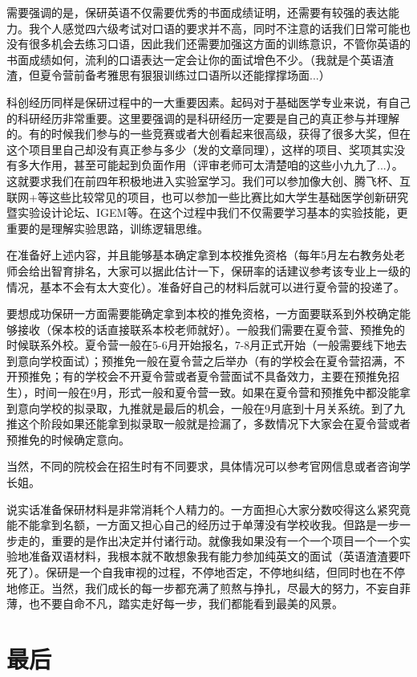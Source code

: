 \documentclass[zihao=-4,fontset=none]{Beautybook-CN}
\begin{document}
需要强调的是，保研英语不仅需要优秀的书面成绩证明，还需要有较强的表达能力。我个人感觉四六级考试对口语的要求并不高，同时不注意的话我们日常可能也没有很多机会去练习口语，因此我们还需要加强这方面的训练意识，不管你英语的书面成绩如何，流利的口语表达一定会让你的面试增色不少。（我就是个英语渣渣，但夏令营前备考雅思有狠狠训练过口语所以还能撑撑场面...）

科创经历同样是保研过程中的一大重要因素。起码对于基础医学专业来说，有自己的科研经历非常重要。这里要强调的是科研经历一定要是自己的真正参与并理解的。有的时候我们参与的一些竞赛或者大创看起来很高级，获得了很多大奖，但在这个项目里自己却没有真正参与多少（发的文章同理），这样的项目、奖项其实没有多大作用，甚至可能起到负面作用（评审老师可太清楚咱的这些小九九了...）。这就要求我们在前四年积极地进入实验室学习。我们可以参加像大创、腾飞杯、互联网+等这些比较常见的项目，也可以参加一些比赛比如大学生基础医学创新研究暨实验设计论坛、IGEM等。在这个过程中我们不仅需要学习基本的实验技能，更重要的是理解实验思路，训练逻辑思维。

在准备好上述内容，并且能够基本确定拿到本校推免资格（每年5月左右教务处老师会给出智育排名，大家可以据此估计一下，保研率的话建议参考该专业上一级的情况，基本不会有太大变化）。准备好自己的材料后就可以进行夏令营的投递了。

要想成功保研一方面需要能确定拿到本校的推免资格，一方面要联系到外校确定能够接收（保本校的话直接联系本校老师就好）。一般我们需要在夏令营、预推免的时候联系外校。夏令营一般在5-6月开始报名，7-8月正式开始（一般需要线下地去到意向学校面试）；预推免一般在夏令营之后举办（有的学校会在夏令营招满，不开预推免；有的学校会不开夏令营或者夏令营面试不具备效力，主要在预推免招生），时间一般在9月，形式一般和夏令营一致。如果在夏令营和预推免中都没能拿到意向学校的拟录取，九推就是最后的机会，一般在9月底到十月关系统。到了九推这个阶段如果还能拿到拟录取一般就是捡漏了，多数情况下大家会在夏令营或者预推免的时候确定意向。

当然，不同的院校会在招生时有不同要求，具体情况可以参考官网信息或者咨询学长姐。

说实话准备保研材料是非常消耗个人精力的。一方面担心大家分数咬得这么紧究竟能不能拿到名额，一方面又担心自己的经历过于单薄没有学校收我。但路是一步一步走的，重要的是作出决定并付诸行动。就像我如果没有一个一个项目一个一个实验地准备双语材料，我根本就不敢想象我有能力参加纯英文的面试（英语渣渣要吓死了）。保研是一个自我审视的过程，不停地否定，不停地纠结，但同时也在不停地修正。当然，我们成长的每一步都充满了煎熬与挣扎，尽最大的努力，不妄自菲薄，也不要自命不凡，踏实走好每一步，我们都能看到最美的风景。

\section{最后}
\end{document}
